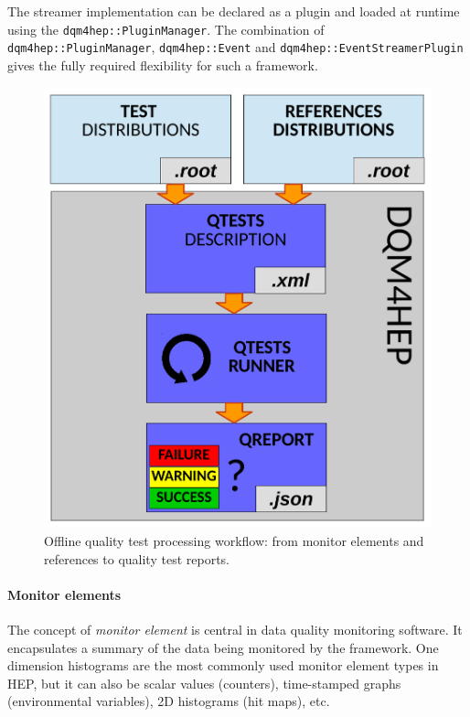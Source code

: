 \documentclass{webofc}
\begin{document}
The streamer implementation can be declared as a plugin and loaded at runtime using the \texttt{dqm4hep::PluginManager}. 
The combination of \texttt{dqm4hep::PluginManager}, \texttt{dqm4hep::Event} and \texttt{dqm4hep::EventStreamerPlugin} gives the fully required flexibility for such a framework. 

{ %

\begin{figure}
    \includegraphics[width=\linewidth]{figs/QTestRunner.pdf}
    \caption{Offline quality test processing workflow: from monitor elements and references to quality test reports.}
    \label{fig:QTestsAndQReports}
\end{figure} 

\paragraph{Monitor elements}

The concept of \textit{monitor element} is central in data quality monitoring software.
It encapsulates a summary of the data being monitored by the framework.
One dimension histograms are the most commonly used monitor element types in HEP, but it can also be scalar values (counters), time-stamped graphs (environmental variables), 2D histograms (hit maps), etc. 

}
\end{document}

